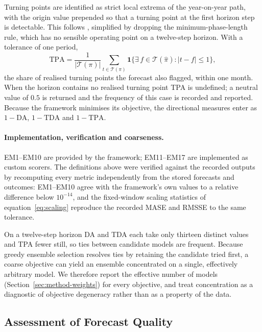 \documentclass[12pt]{article}
\begin{document}
Turning points are identified as strict local extrema of the year-on-year path,
with the origin value prepended so that a turning point at the first horizon step
is detectable. This follows \citet{bry1971}, simplified by dropping the
minimum-phase-length rule, which has no sensible operating point on a twelve-step
horizon. With a tolerance of one period,
\begin{equation}
    \text{TPA} = \frac{1}{|\mathcal{T}(\pi)|}
        \sum_{t \in \mathcal{T}(\pi)}
        \mathbf{1}\big\{\exists\, f \in \mathcal{T}(\hat{\pi}) : |t - f| \le 1 \big\},
\end{equation}
the share of realised turning points the forecast also flagged, within one month.
When the horizon contains no realised turning point TPA is undefined; a neutral
value of $0.5$ is returned and the frequency of this case is recorded and
reported. Because the framework minimises its objective, the directional measures
enter as $1 - \text{DA}$, $1 - \text{TDA}$ and $1 - \text{TPA}$.

\paragraph{Implementation, verification and coarseness.}
EM1--EM10 are provided by the framework; EM11--EM17 are implemented as custom
scorers. The definitions above were verified against the recorded outputs by
recomputing every metric independently from the stored forecasts and outcomes:
EM1--EM10 agree with the framework's own values to a relative difference below
$10^{-14}$, and the fixed-window scaling statistics of
equation~\eqref{eq:scaling} reproduce the recorded MASE and RMSSE to the same
tolerance.

On a twelve-step horizon DA and TDA each take only thirteen distinct values and
TPA fewer still, so ties between candidate models are frequent. Because greedy
ensemble selection resolves ties by retaining the candidate tried first, a coarse
objective can yield an ensemble concentrated on a single, effectively arbitrary
model. We therefore report the effective number of models
(Section~\ref{sec:method-weights}) for every objective, and treat concentration
as a diagnostic of objective degeneracy rather than as a property of the data.

\subsection{Assessment of Forecast Quality}
\label{sec:method-assessment}
\end{document}
